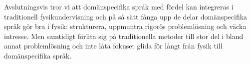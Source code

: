 Avslutningsvis tror vi att domänspecifika språk med fördel kan integreras i traditionell fysikundervisning och på så sätt fånga upp de delar domänspecifika språk gör bra i fysik: strukturera, uppmuntra rigorös problemlösning och väcka intresse. Men samtidigt förlita sig på traditionella metoder till stor del i bland annat problemlösning och inte låta fokuset glida för långt från fysik till domänspecifika språk.







